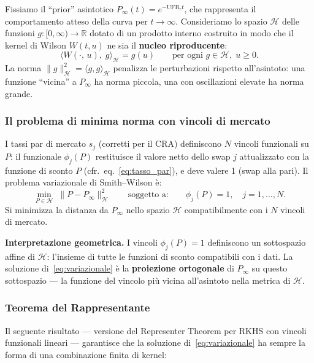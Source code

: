 \documentclass[11pt,a4paper]{article}
\theoremstyle{plain}
\theoremstyle{definition}
\theoremstyle{remark}
\newcommand{\R}{\mathbb{R}}
\newcommand{\UFR}{\mathrm{UFR}}
\begin{document}
Fissiamo il ``prior'' asintotico $P_\infty(t)=e^{-\UFR_c t}$, che rappresenta
il comportamento atteso della curva per $t\to\infty$.
Consideriamo lo spazio $\mathcal{H}$ delle funzioni $g:[0,\infty)\to\R$
dotato di un prodotto interno costruito in modo che il kernel di Wilson
$W(t,u)$ ne sia il \textbf{nucleo riproducente}:
\[
  \langle W(\cdot,\, u),\; g \rangle_{\mathcal{H}} = g(u)
  \qquad \text{per ogni } g \in \mathcal{H},\; u \ge 0.
\]
La norma $\|g\|_{\mathcal{H}}^2 = \langle g,g\rangle_{\mathcal{H}}$ penalizza
le perturbazioni rispetto all'asintoto: una funzione ``vicina'' a $P_\infty$
ha norma piccola, una con oscillazioni elevate ha norma grande.

\subsubsection*{Il problema di minima norma con vincoli di mercato}

I tassi par di mercato $s_j$ (corretti per il CRA) definiscono $N$ vincoli
funzionali su $P$: il funzionale $\phi_j(P)$ restituisce il valore netto
dello swap $j$ attualizzato con la funzione di sconto $P$
(cfr.~eq.~\eqref{eq:tasso_par}), e deve valere 1 (swap alla pari).
Il problema variazionale di Smith--Wilson \`e:
\begin{equation}
  \label{eq:variazionale}
  \min_{P \in \mathcal{H}}\;\|P - P_\infty\|_{\mathcal{H}}^2
  \qquad\text{soggetto a:}\qquad
  \phi_j(P) = 1, \quad j=1,\ldots,N.
\end{equation}
Si minimizza la distanza da $P_\infty$ nello spazio $\mathcal{H}$ compatibilmente
con i $N$ vincoli di mercato.

\textbf{Interpretazione geometrica.}
I vincoli $\phi_j(P)=1$ definiscono un sottospazio affine di $\mathcal{H}$:
l'insieme di tutte le funzioni di sconto compatibili con i dati.
La soluzione di~\eqref{eq:variazionale} \`e la \textbf{proiezione ortogonale}
di $P_\infty$ su questo sottospazio --- la funzione del vincolo pi\`u vicina
all'asintoto nella metrica di $\mathcal{H}$.

\subsubsection*{Teorema del Rappresentante}

Il seguente risultato --- versione del Representer Theorem per RKHS
con vincoli funzionali lineari --- garantisce che la soluzione di~\eqref{eq:variazionale}
ha sempre la forma di una combinazione finita di kernel:
\end{document}
